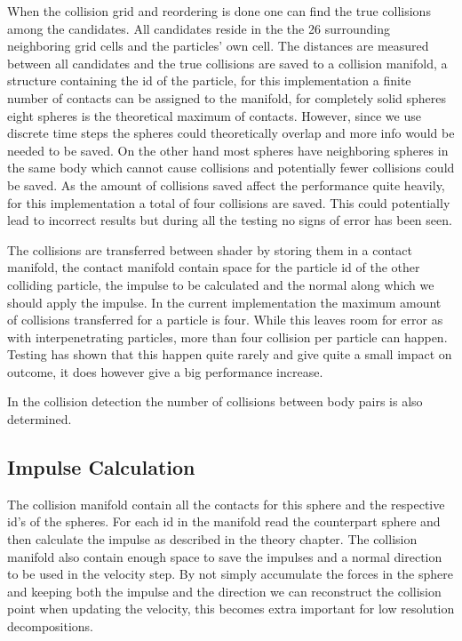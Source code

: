 When the collision grid and reordering is done one can find the true collisions
among the candidates. All candidates reside in the the 26 surrounding neighboring
grid cells and the particles' own cell. The distances are measured between all
candidates and the true collisions are saved to a collision manifold, a structure
containing the id of the particle, for this implementation a finite number of
contacts can be assigned to the manifold, for completely solid spheres eight spheres
is the theoretical maximum of contacts. However, since we use discrete time steps
the spheres could theoretically overlap and more info would be needed to be saved.
On the other hand most spheres have neighboring spheres in the same body which cannot
cause collisions and potentially fewer collisions could be saved. As the amount of
collisions saved affect the performance quite heavily, for this implementation a total
of four collisions are saved. This could potentially lead to incorrect results but
during all the testing no signs of error has been seen.

The collisions are transferred between shader by storing them in a contact manifold,
the contact manifold contain space for the particle id of the other colliding particle,
the impulse to be calculated and the normal along which we should apply the impulse.
In the current implementation the maximum amount of collisions transferred for a
particle is four. While this leaves room for error as with interpenetrating particles,
more than four collision per particle can happen. Testing has shown that this happen
quite rarely and give quite a small impact on outcome, it does however give a big
performance increase.

In the collision detection the number of collisions between body pairs is also determined.


\subsection{Impulse Calculation}
The collision manifold contain all the contacts for this sphere and the respective
id's of the spheres. For each id in the manifold read the counterpart sphere and
then calculate the impulse as described in the theory chapter. The collision manifold
also contain enough space to save the impulses and a normal direction to be used
in the velocity step. By not simply accumulate the forces in the sphere and keeping
both the impulse and the direction we can reconstruct the collision point when updating
the velocity, this becomes extra important for low resolution decompositions.


